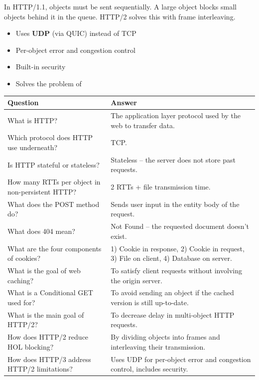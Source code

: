 \begin{warnbox}
In HTTP/1.1, objects must be sent sequentially. A large object blocks small objects behind it in the queue. HTTP/2 solves this with frame interleaving.
\end{warnbox}

\begin{keybox}
\begin{itemize}[noitemsep]
    \item Uses \textbf{UDP} (via QUIC) instead of TCP
    \item Per-object error and congestion control
    \item Built-in security
    \item Solves the problem of \end{itemize}
\end{keybox}

\begin{exambox}
\small
\begin{longtable}{p{7cm}p{7cm}}
\toprule
\textbf{Question} & \textbf{Answer} \\
\midrule
\endhead
What is HTTP? & The application layer protocol used by the web to transfer data. \\
\midrule
Which protocol does HTTP use underneath? & TCP. \\
\midrule
Is HTTP stateful or stateless? & Stateless -- the server does not store past requests. \\
\midrule
How many RTTs per object in non-persistent HTTP? & 2 RTTs + file transmission time. \\
\midrule
What does the POST method do? & Sends user input in the entity body of the request. \\
\midrule
What does 404 mean? & Not Found -- the requested document doesn't exist. \\
\midrule
What are the four components of cookies? & 1) Cookie in response, 2) Cookie in request, 3) File on client, 4) Database on server. \\
\midrule
What is the goal of web caching? & To satisfy client requests without involving the origin server. \\
\midrule
What is a Conditional GET used for? & To avoid sending an object if the cached version is still up-to-date. \\
\midrule
What is the main goal of HTTP/2? & To decrease delay in multi-object HTTP requests. \\
\midrule
How does HTTP/2 reduce HOL blocking? & By dividing objects into frames and interleaving their transmission. \\
\midrule
How does HTTP/3 address HTTP/2 limitations? & Uses UDP for per-object error and congestion control, includes security. \\
\bottomrule
\end{longtable}
\end{exambox}


